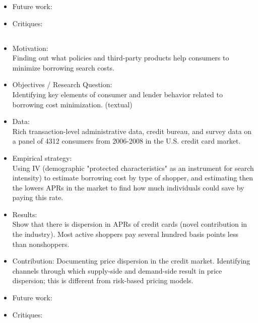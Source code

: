 \documentclass{article}
\theoremstyle{definition}
\begin{document}
\begin{itemize}
    \item Future work: 
    
    \item Critiques: 
    
    \end{itemize}

\subsection*{\cite{stango2016borrowing}}

\begin{itemize}
    \item Motivation: \\ Finding out what policies and third-party products help consumers to minimize borrowing search costs.  
    
    \item Objectives / Research Question:\\ Identifying key elements of consumer and lender behavior related to borrowing cost minimization. (textual)
    
    \item Data: \\ Rich transaction-level administrative data, credit bureau, and survey data on a panel of 4312 consumers from 2006-2008 in the U.S. credit card market. 
    
    \item Empirical strategy: \\ Using IV (demographic "protected characteristics" as an instrument for search intensity) to estimate borrowing cost by type of shopper, and estimating then the lowers APRs in the market to find how much individuals could save by paying this rate. 

    
    \item Results: \\  Show that there is dispersion in APRs of credit cards (novel contribution in the industry). 
    Most active shoppers pay several hundred basis points less than nonshoppers. 
    
    \item Contribution: Documenting price dispersion in the credit market.  Identifying channels through which supply-side and demand-side result in price dispersion; this is different from risk-based pricing models.
    
    \item Future work: 
    
    \item Critiques: 
\end{itemize}
\end{document}
